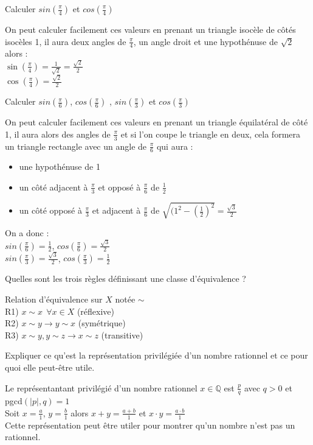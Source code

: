 \documentclass[12pt]{article}
\newcommand*{\xfield}[1]{\begin{mdframed}\centering #1\end{mdframed}\bigskip}
\newenvironment{note}{}{}
\begin{document}
\begin{note}
	\xfield{Calculer $sin(\frac{\pi}{4})$ et $cos(\frac{\pi}{4})$}
	\xfield{On peut calculer facilement ces valeurs en prenant un triangle isocèle de côtés isocèles 1, il aura deux angles de $\frac{\pi}{4}$, un angle droit et une hypothénuse de $\sqrt{2}$ alors : \\
	$\sin(\frac{\pi}{4}) = \frac{1}{\sqrt{2}} = \frac{\sqrt{2}}{2}$\\
	$\cos(\frac{\pi}{4}) = \frac{\sqrt{2}}{2}$}
\end{note}
\begin{note}
	\xfield{Calculer
$sin(\frac{\pi}{6})$,  $cos(\frac{\pi}{6})$ , $sin(\frac{\pi}{3})$ et $cos(\frac{\pi}{3})$}
	\xfield{On peut calculer facilement ces valeurs en prenant un triangle équilatéral de côté 1, il aura alors des angles de $\frac{\pi}{3}$ et si l'on coupe le triangle en deux, cela formera un triangle rectangle avec un angle de $\frac{\pi}{6}$ qui aura :
	\begin{itemize}
	\item une hypothénuse de 1
	\item  un côté adjacent à $\frac{\pi}{3}$ et opposé à $\frac{\pi}{6}$ de $\frac{1}{2}$
	\item un côté opposé à $\frac{\pi}{3}$ et adjacent à $\frac{\pi}{6}$ de $\sqrt{(1^2-(\frac{1}{2})^2} = \frac{\sqrt{3}}{2}$
	\end{itemize}
	On a donc :\\
	$sin(\frac{\pi}{6}) = \frac{1}{2}$, $cos(\frac{\pi}{6}) = \frac{\sqrt{3}}{2}$ \\
	$sin(\frac{\pi}{3}) = \frac{\sqrt{3}}{2}$, $cos(\frac{\pi}{3}) = \frac{1}{2}$}
\end{note}
\begin{note}
	\xfield{Quelles sont les trois règles définissant une classe d'équivalence ?}
	\xfield{Relation d'équivalence sur $X$ notée $\sim$ \\
	R1) $x \sim x\ \ \forall x \in X$ (réflexive)\\
	R2) $x \sim y \rightarrow y\sim x$ (symétrique)\\
	R3) $x \sim y,y \sim z \rightarrow x \sim z$ (transitive)}
\end{note}
\begin{note}
	\xfield{Expliquer ce qu'est la représentation privilégiée d'un nombre rationnel et ce pour quoi elle peut-être utile.}
	\xfield{Le représentantant privilégié d'un nombre rationnel $x \in \mathbb{Q}$ est $\frac{p}{q}$ avec $q > 0$ et pgcd$(\lvert p \lvert,q) = 1$\\
	Soit $x = \frac{a}{1}$, $y = \frac{b}{1}$ alors $x+y = \frac{a+b}{1}$ et $x \cdot y = \frac{a\cdot b}{1}$\\
	Cette représentation peut être utiler pour montrer qu'un nombre n'est pas un rationnel.}
\end{note}
\end{document}
